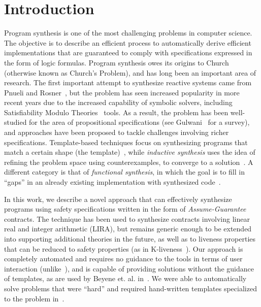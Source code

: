 
\section{Introduction}

Program synthesis is one of the most challenging problems in computer science. The objective is to describe an efficient process to automatically derive efficient implementations that are guaranteed to comply with specifications expressed in the form of logic formulas. Program synthesis owes its origins to Church~\cite{church1962logic} (otherwise known as Church's Problem), and has long been an important area of research.
%
%
The first important attempt to synthesize reactive systems came from Pnueli and Rosner~\cite{pnueli1989synthesis}, but the problem has seen increased popularity in more recent years due to the increased capability of symbolic solvers, including Satisfiability Modulo Theories~\cite{BarFT-SMTLIB} tools. As a result, the problem has been well-studied for the area of propositional specifications (see Gulwani~\cite{gulwani2010dimensions} for a survey), and approaches have been proposed to tackle challenges involving richer specifications. Template-based techniques focus on synthesizing programs that
match a certain shape (the template)~\cite{srivastava2013template}, while {\em inductive synthesis} uses the idea of refining the problem space using counterexamples, to converge to a solution~\cite{flener2001inductive}. A different category is that of \textit{functional synthesis}, in which the goal is to fill in ``gaps'' in an already existing implementation with synthesized code~\cite{kuncak2013functional}.

In this work, we describe a novel approach that can effectively synthesize
programs using safety specifications written in the form of {\em
Assume-Guarantee} contracts. The technique has been used to synthesize contracts involving linear real and integer arithmetic (LIRA),
but remains generic enough to be extended into supporting additional theories
in the future, as well as to liveness properties that can be reduced to safety properties (as in K-liveness~\cite{claessen2012liveness}).  Our approach is completely automated and requires no guidance to the tools in terms of user interaction (unlike~\cite{ryzhyk2014user,ryzhyk2016developing}), and is capable of providing solutions without the guidance of templates, as are used by Beyene et. al.
in~\cite{beyene2014constraint}.  We were able to automatically solve problems that were ``hard'' and required hand-written templates specialized to the problem in~\cite{beyene2014constraint}.

